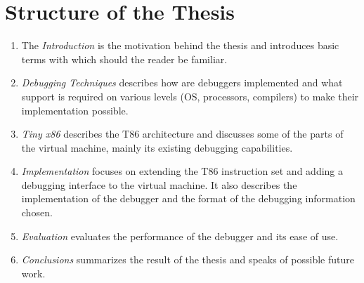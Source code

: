 \section{Structure of the Thesis}
\begin{enumerate}
    \item The \textit{Introduction} is the motivation behind the thesis and
        introduces basic terms with which should the reader be familiar.
    \item \textit{Debugging Techniques} describes how are debuggers implemented
        and what support is required on various levels (OS, processors,
        compilers) to make their implementation possible.
    \item \textit{Tiny x86} describes the T86 architecture and discusses some
        of the parts of the virtual machine, mainly its existing debugging
        capabilities.
    \item \textit{Implementation} focuses on extending the T86 instruction set
        and adding a debugging interface to the virtual machine. It also
        describes the implementation of the debugger and the format of the
        debugging information chosen.
    \item \textit{Evaluation} evaluates the performance of the debugger and its
        ease of use.
    \item \textit{Conclusions} summarizes the result of the thesis and speaks
        of possible future work.
\end{enumerate}
